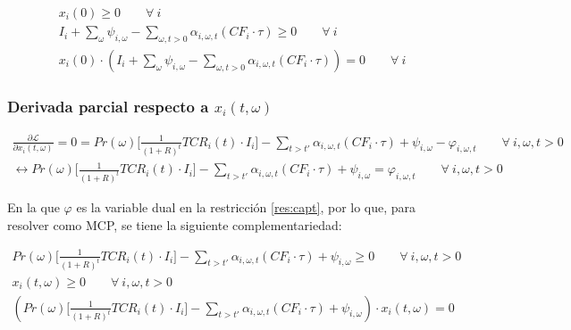 \begin{footnotesize}
\begin{align}
    x_i(0)\geq 0 \qquad \forall \  i \\
    I_i  + \sum_{\omega}\psi_{i,\omega} -\sum_{\omega, t>0} \alpha_{i,\omega,t}(CF_i\cdot \tau) \geq 0  \qquad \forall \  i\\
    x_i(0)\cdot(I_i  + \sum_{\omega}\psi_{i,\omega} -\sum_{\omega, t>0} \alpha_{i,\omega,t}(CF_i\cdot \tau))=0 \qquad \forall \  i
\end{align}
\end{footnotesize}



\subsubsection{Derivada parcial respecto a $x_i(t,\omega)$}

\begin{footnotesize}
\begin{align}
    \frac{\partial \mathcal{L} }{\partial x_i(t,\omega)}= 0 = Pr(\omega) \Bigg[\frac{1}{(1+R)^t}TCR_i(t) \cdot I_i \Bigg] - \sum_{t> t\prime}\alpha_{i,\omega,t} ( CF_i \cdot \tau)+ \psi_{i,\omega}-\varphi_{i,\omega,t} \qquad  \forall \  i, \omega, t> 0\\
    \leftrightarrow Pr(\omega) \Bigg[\frac{1}{(1+R)^t}TCR_i(t) \cdot I_i \Bigg] - \sum_{t> t\prime}\alpha_{i,\omega,t} ( CF_i \cdot \tau)+ \psi_{i,\omega}=\varphi_{i,\omega,t} \qquad  \forall \  i, \omega, t> 0
\end{align}
\end{footnotesize}


En la que $\varphi$ es la variable dual en la restricción \ref{res:capt}, por lo que, para resolver como MCP, se tiene la siguiente complementariedad:


\begin{footnotesize}
\begin{align}
    Pr(\omega) \Bigg[\frac{1}{(1+R)^t}TCR_i(t) \cdot I_i \Bigg] - \sum_{t> t\prime}\alpha_{i,\omega,t} ( CF_i \cdot \tau)+ \psi_{i,\omega} \geq 0 \qquad  \forall \  i, \omega, t> 0\\
    x_i(t,\omega) \geq 0 \qquad  \forall \  i, \omega, t> 0\\
    (Pr(\omega) \Bigg[\frac{1}{(1+R)^t}TCR_i(t) \cdot I_i \Bigg] - \sum_{t> t\prime}\alpha_{i,\omega,t} ( CF_i \cdot \tau)+ \psi_{i,\omega})\cdot x_i(t,\omega)=0
\end{align}

\end{footnotesize}


